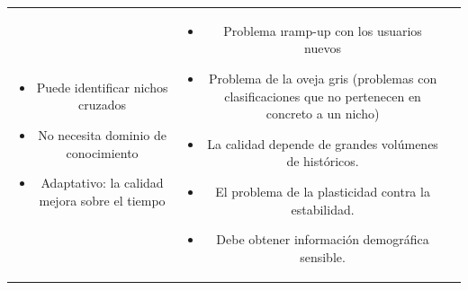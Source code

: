 \begin{table}[h]
\begin{center}
\begin{tabular}{| c | c | c |}
{\begin{itemize}[topsep=0pt]
			\item Puede identificar nichos cruzados
			\item No necesita dominio de conocimiento
			\item Adaptativo: la calidad mejora sobre el tiempo
			\end{itemize}} &
			\parbox{5cm}{\begin{itemize}[topsep=0pt]
			\item Problema \i{ramp-up} con los usuarios nuevos
			\item Problema de la oveja gris (problemas con clasificaciones que no pertenecen en concreto a un nicho)
			\item La calidad depende de grandes volúmenes de históricos.
			\item El problema de la plasticidad contra la estabilidad.
			\item Debe obtener información demográfica sensible.
			\end{itemize}} \\
			\bottomrule
		\end{tabular}
	\end{center}
\end{table}
